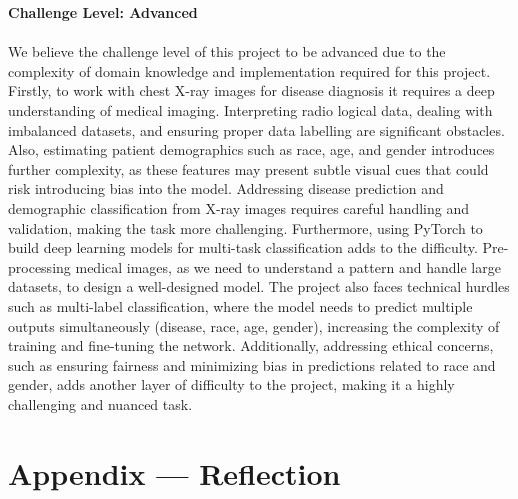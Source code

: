 \documentclass{article}
\begin{document}
\textbf{Challenge Level: Advanced} \\ \\ 
We believe the challenge level of this project to be advanced due to the complexity of domain knowledge and implementation required for this project. Firstly, to work with chest X-ray images for disease diagnosis it requires a deep understanding of medical imaging. Interpreting radio logical data, dealing with imbalanced datasets, and ensuring proper data labelling are significant obstacles. Also, estimating patient demographics such as race, age, and gender introduces further complexity, as these features may present subtle visual cues that could risk introducing bias into the model. Addressing disease prediction and demographic classification from X-ray images requires careful handling and validation, making the task more challenging.
Furthermore, using PyTorch to build deep learning models for multi-task classification adds to the difficulty. Pre-processing medical images, as we need to understand a pattern and handle large datasets, to design a well-designed model. The project also faces technical hurdles such as multi-label classification, where the model needs to predict multiple outputs simultaneously (disease, race, age, gender), increasing the complexity of training and fine-tuning the network. Additionally, addressing ethical concerns, such as ensuring fairness and minimizing bias in predictions related to race and gender, adds another layer of difficulty to the project, making it a highly challenging and nuanced task.

\section*{Appendix --- Reflection}
\end{document}

